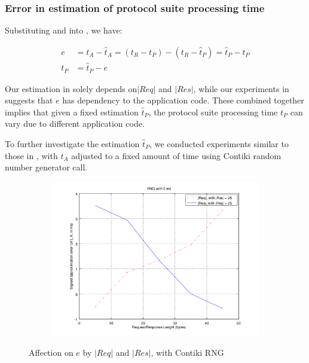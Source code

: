 \subsubsection{Error in estimation of protocol suite processing time}

Substituting  and  into , we have:

\begin{equation}\label{Eq: tP error}
	\begin{aligned}
		e &= t_A - \hat{t}_A = (t_R - t_P) - (t_R - \hat{t}_P) = \hat{t}_P - t_P\\
		t_P &= \hat{t}_P - e
	\end{aligned}
\end{equation}

Our estimation in  solely depends on$|Req|$ and $|Res|$, while our experiments in  suggests that $e$ has dependency to the application code. These combined together implies that given a fixed estimation $\hat{t}_P$, the protocol suite processing time $t_P$ can vary due to different application code.

To further investigate the estimation $\hat{t}_P$, we conducted experiments similar to those in , with $t_A$ adjusted to a fixed amount of time using Contiki random number generator call.

\begin{figure}
	\center
	\begin{subfigure}{0.45\linewidth}
		\center
		\includegraphics[width=\linewidth]{fig/errwithlen5ms.png}
	\end{subfigure}
	\caption{Affection on $e$ by $|Req|$ and $|Res|$, with Contiki RNG}
\end{figure}

